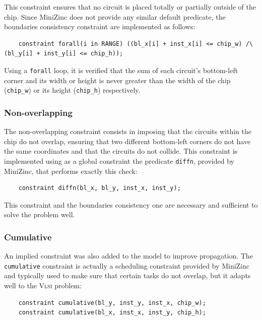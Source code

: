 \documentclass[a4paper, 12pt]{article}
\begin{document}
This constraint ensures that no circuit is placed totally or partially outside of the chip. Since MiniZinc does not provide any similar default predicate, the boundaries consistency constraint are implemented as follows:
\begin{verbatim}
    constraint forall(i in RANGE) ((bl_x[i] + inst_x[i] <= chip_w) /\ (bl_y[i] + inst_y[i] <= chip_h));
\end{verbatim}

Using a \verb|forall| loop, it is verified that the sum of each circuit's bottom-left corner and its width or height is never greater than the width of the chip (\verb|chip_w|) or its height (\verb|chip_h|) respectively.


\subsubsection{Non-overlapping}

The non-overlapping constraint consists in imposing that the circuits within the chip do not overlap, ensuring that two different bottom-left corners do not have the same coordinates and that the circuits do not collide. This constraint is implemented using as a global constraint the predicate \verb|diffn|, provided by MiniZinc, that performs exactly this check:
\begin{verbatim}
    constraint diffn(bl_x, bl_y, inst_x, inst_y);
\end{verbatim}

This constraint and the boundaries consistency one are necessary and sufficient to solve the problem well.


\subsubsection{Cumulative}

An implied constraint was also added to the model to improve propagation. The \verb|cumulative| constraint is actually a scheduling constraint provided by MiniZinc and typically used to make sure that certain tasks do not overlap, but it adapts well to the \textsc{Vlsi} problem:
\begin{verbatim}
    constraint cumulative(bl_y, inst_y, inst_x, chip_w);
    constraint cumulative(bl_x, inst_x, inst_y, chip_h);
\end{verbatim}
\end{document}
